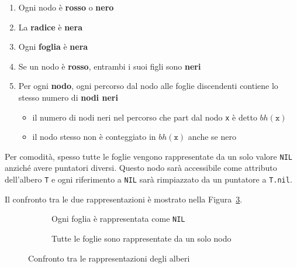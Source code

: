 \documentclass[italian, 10pt]{article}
\begin{document}
\begin{enumerate}[label=\arabic*., ref=(\arabic*)]
  \item \label{enum:proprieta-1-nodi-rb}Ogni nodo è \textbf{rosso} o \textbf{nero}
  \item \label{enum:proprieta-2-nodi-rb}La \textbf{radice} è \textbf{nera}
  \item \label{enum:proprieta-3-nodi-rb}Ogni \textbf{foglia} è \textbf{nera}
  \item \label{enum:proprieta-4-nodi-rb}Se un nodo è \textbf{rosso}, entrambi i suoi figli sono \textbf{neri}
  \item \label{enum:proprieta-5-nodi-rb} Per ogni \textbf{nodo}, ogni percorso dal nodo alle foglie discendenti contiene lo stesso numero di \textbf{nodi neri}
        \begin{itemize}
          \item il numero di nodi neri nel percorso che part dal nodo \texttt{x} è detto \(bh(\texttt{x})\)
          \item il nodo stesso non è conteggiato in \(bh(\texttt{x})\) anche se nero
        \end{itemize}
\end{enumerate}

Per comodità, spesso tutte le foglie vengono rappresentate da un solo valore \texttt{NIL} anziché avere puntatori diversi.
Questo nodo sarà accessibile come attributo dell'albero \texttt{T} e ogni riferimento a \texttt{NIL} sarà rimpiazzato da un puntatore a \texttt{T.nil}.

\bigskip
Il confronto tra le due rappresentazioni è mostrato nella Figura~\ref{fig:confronto-tra-le-rappresentazioni-degli-alberi-RB}.

\begin{figure}[htbp]
  \bigskip
  \centering
  \begin{subfigure}[b]{.495\textwidth}
    \centering
    \caption{Ogni foglia è rappresentata come \texttt{NIL}}
    \bigskip
    \label{fig:foglia-rappresentata-come-NIL}
  \end{subfigure}
  \begin{subfigure}[b]{.495\textwidth}
    \centering
    \caption{Tutte le foglie sono rappresentate da un solo nodo}
    \bigskip
    \label{fig:foglie-rappresentate-da-un-solo-nodo}
  \end{subfigure}
  \caption{Confronto tra le rappresentazioni degli alberi \RB}
  \label{fig:confronto-tra-le-rappresentazioni-degli-alberi-RB}
  \bigskip
\end{figure}
\end{document}
